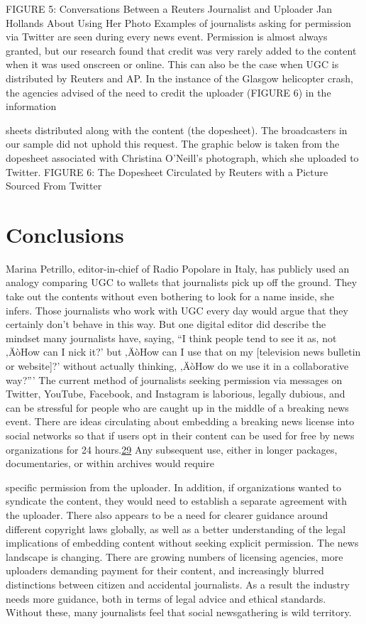 \documentclass[symmetric, notoc, nobib]{towcenter-book}
\begin{document}
FIGURE 5: Conversations Between a Reuters Journalist and Uploader Jan Hollands About Using Her Photo
Examples of journalists asking for permission via Twitter are seen during
every news event. Permission is almost always granted, but our research
found that credit was very rarely added to the content when it was used
onscreen or online. This can also be the case when UGC is distributed by
Reuters and AP. In the instance of the Glasgow helicopter crash, the agencies
advised of the need to credit the uploader (FIGURE 6) in the information

sheets distributed along with the content (the dopesheet). The broadcasters
in our sample did not uphold this request. The graphic below is taken from
the dopesheet associated with Christina O'Neill's photograph, which she
uploaded to Twitter.
FIGURE 6: The Dopesheet Circulated by Reuters with a Picture Sourced From Twitter
\section{Conclusions}
Marina Petrillo, editor-in-chief of Radio Popolare in Italy, has publicly
used an analogy comparing UGC to wallets that journalists pick up off the
ground. They take out the contents without even bothering to look for a
name inside, she infers. Those journalists who work with UGC every day
would argue that they certainly don't behave in this way. But one digital editor
did describe the mindset many journalists have, saying, ``I think people
tend to see it as, not ‚ÄòHow can I nick it?' but ‚ÄòHow can I use that on my [television
news bulletin or website]?' without actually thinking, ‚ÄòHow do we use
it in a collaborative way?'''
The current method of journalists seeking permission via messages on
Twitter, YouTube, Facebook, and Instagram is laborious, legally dubious,
and can be stressful for people who are caught up in the middle of a breaking
news event. There are ideas circulating about embedding a breaking
news license into social networks so that if users opt in their content can
be used for free by news organizations for 24 hours.{\href{#endnotes}{29}} Any subsequent use,
either in longer packages, documentaries, or within archives would require

specific permission from the uploader. In addition, if organizations wanted
to syndicate the content, they would need to establish a separate agreement
with the uploader.
There also appears to be a need for clearer guidance around different copyright
laws globally, as well as a better understanding of the legal implications
of embedding content without seeking explicit permission.
The news landscape is changing. There are growing numbers of licensing
agencies, more uploaders demanding payment for their content, and
increasingly blurred distinctions between citizen and accidental journalists.
As a result the industry needs more guidance, both in terms of legal advice
and ethical standards. Without these, many journalists feel that social newsgathering
is wild territory.
\end{document}
